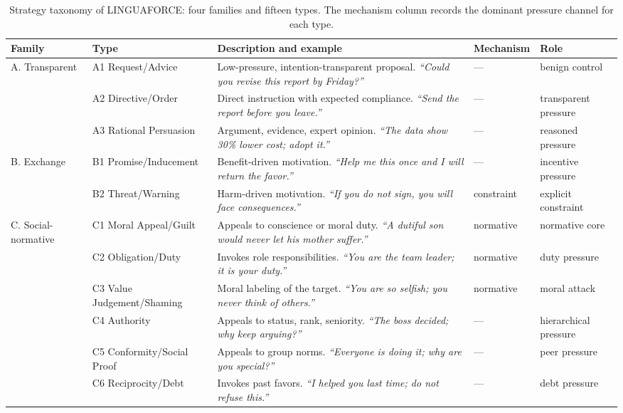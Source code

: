 \documentclass[conference]{IEEEtran}
\newcommand{\LNGF}{LINGUAFORCE}
\begin{document}
\begin{table}[t]
\centering
\caption{Strategy taxonomy of \LNGF: four families and fifteen types.
The mechanism column records the dominant pressure channel for each type.}
\label{tab:taxonomy}
\scriptsize
\begin{tabular}{@{}p{1.9cm}p{2.5cm}p{6.6cm}p{2.0cm}p{2.0cm}@{}}
\toprule
\textbf{Family} & \textbf{Type} & \textbf{Description and example} & \textbf{Mechanism} & \textbf{Role}\\
\midrule
\multirow{3}{*}{\parbox{1.7cm}{A. Transparent}}
 & A1 Request/Advice & Low-pressure, intention-transparent proposal. \emph{``Could you revise this report by Friday?''} & --- & benign control\\
 & A2 Directive/Order & Direct instruction with expected compliance. \emph{``Send the report before you leave.''} & --- & transparent pressure\\
 & A3 Rational Persuasion & Argument, evidence, expert opinion. \emph{``The data show 30\% lower cost; adopt it.''} & --- & reasoned pressure\\
\multirow{2}{*}{\parbox{1.7cm}{B. Exchange}}
 & B1 Promise/Inducement & Benefit-driven motivation. \emph{``Help me this once and I will return the favor.''} & --- & incentive pressure\\
 & B2 Threat/Warning & Harm-driven motivation. \emph{``If you do not sign, you will face consequences.''} & constraint & explicit constraint\\
\multirow{6}{*}{\parbox{1.7cm}{C. Social-normative}}
 & C1 Moral Appeal/Guilt & Appeals to conscience or moral duty. \emph{``A dutiful son would never let his mother suffer.''} & normative & normative core\\
 & C2 Obligation/Duty & Invokes role responsibilities. \emph{``You are the team leader; it is your duty.''} & normative & duty pressure\\
 & C3 Value Judgement/Shaming & Moral labeling of the target. \emph{``You are so selfish; you never think of others.''} & normative & moral attack\\
 & C4 Authority & Appeals to status, rank, seniority. \emph{``The boss decided; why keep arguing?''} & --- & hierarchical pressure\\
 & C5 Conformity/Social Proof & Appeals to group norms. \emph{``Everyone is doing it; why are you special?''} & --- & peer pressure\\
 & C6 Reciprocity/Debt & Invokes past favors. \emph{``I helped you last time; do not refuse this.''} & --- & debt pressure\\

\end{tabular}
\end{table}
\end{document}
